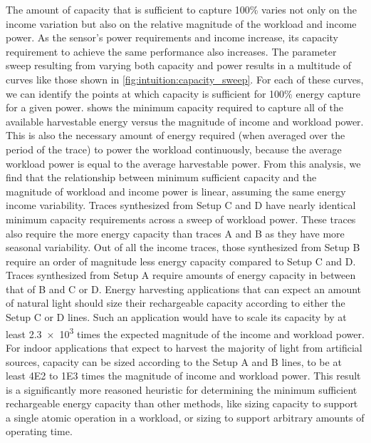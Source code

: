 The amount of capacity that is sufficient to capture 100\% varies not only on the income variation but also on the relative magnitude of the workload and income power.
As the sensor's power requirements and income increase, its capacity requirement to achieve the same performance also increases.
The parameter sweep resulting from varying both capacity and power results in a multitude of curves like those shown in \cref{fig:intuition:capacity_sweep}.
For each of these curves, we can identify the points at which capacity is sufficient for 100\% energy capture for a given power.
 shows the minimum capacity required to capture all of the available harvestable energy versus the magnitude of income and workload power.
This is also the necessary amount of energy required (when averaged over the period of the trace) to power the workload continuously, because the average workload power is equal to the average harvestable power.
From this analysis, we find that the relationship between minimum sufficient capacity and the magnitude of workload and income power is linear, assuming the same energy income variability.
Traces synthesized from Setup C and D have nearly identical minimum capacity requirements across a sweep of workload power.
These traces also require the more energy capacity than traces A and B as they have more seasonal variability.
Out of all the income traces, those synthesized from Setup B require an order of magnitude less energy capacity compared to Setup C and D.
Traces synthesized from Setup A require amounts of energy capacity in between that of B and C or D.
Energy harvesting applications that can expect an amount of natural light should size their rechargeable capacity according to either the Setup C or D lines.
Such an application would have to scale its capacity by at least \num{2.3e3} times the expected magnitude of the income and workload power.
For indoor applications that expect to harvest the majority of light from artificial sources, capacity can be sized according to the Setup A and B lines, to be at least \num{4E2} to \num{1E3} times the magnitude of income and workload power.
This result is a significantly more reasoned heuristic for determining the minimum sufficient rechargeable energy capacity than other methods, like sizing capacity to support a single atomic operation in a workload, or sizing to support arbitrary amounts of operating time.

